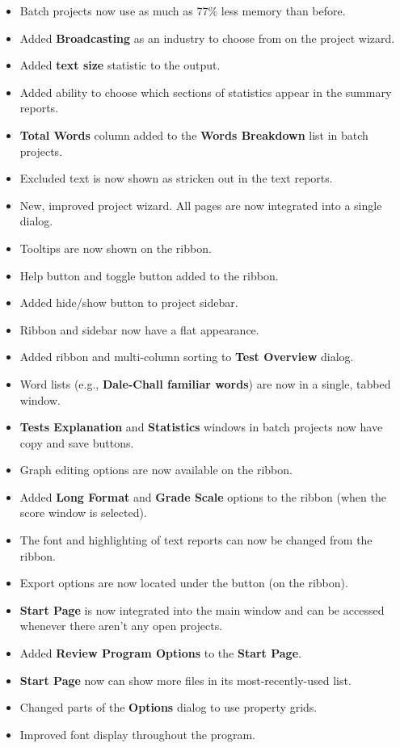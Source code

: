 \documentclass[
]{book}
\providecommand{\tightlist}{%
  \setlength{\itemsep}{0pt}\setlength{\parskip}{0pt}}
\theoremstyle{definition}
\theoremstyle{definition}
\theoremstyle{definition}
\theoremstyle{definition}
\theoremstyle{remark}
\begin{document}
\begin{itemize}
\tightlist
\item
  Batch projects now use as much as 77\% less memory than before.
\item
  Added \textbf{Broadcasting} as an industry to choose from on the project wizard.
\item
  Added \textbf{text size} statistic to the output.
\item
  Added ability to choose which sections of statistics appear in the summary reports.
\item
  \textbf{Total Words} column added to the \textbf{Words Breakdown} list in batch projects.
\item
  Excluded text is now shown as stricken out in the text reports.
\item
  New, improved project wizard. All pages are now integrated into a single dialog.
\item
  Tooltips are now shown on the ribbon.
\item
  Help button and toggle button added to the ribbon.
\item
  Added hide/show button to project sidebar.
\item
  Ribbon and sidebar now have a flat appearance.
\item
  Added ribbon and multi-column sorting to \textbf{Test Overview} dialog.
\item
  Word lists (e.g., \textbf{Dale-Chall familiar words}) are now in a single, tabbed window.
\item
  \textbf{Tests Explanation} and \textbf{Statistics} windows in batch projects now have copy and save buttons.
\item
  Graph editing options are now available on the ribbon.
\item
  Added \textbf{Long Format} and \textbf{Grade Scale} options to the ribbon (when the score window is selected).
\item
  The font and highlighting of text reports can now be changed from the ribbon.
\item
  Export options are now located under the  button (on the ribbon).
\item
  \textbf{Start Page} is now integrated into the main window and can be accessed whenever there aren't any open projects.
\item
  Added \textbf{Review Program Options} to the \textbf{Start Page}.
\item
  \textbf{Start Page} now can show more files in its most-recently-used list.
\item
  Changed parts of the \textbf{Options} dialog to use property grids.
\item
  Improved font display throughout the program.
\end{itemize}
\end{document}
